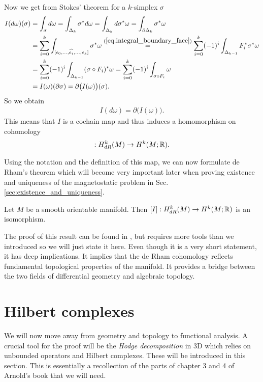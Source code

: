 \documentclass[../master_thesis.tex]{subfiles}
\begin{document}
Now we get from Stokes' theorem for a $k$-simplex $\sigma$
\begin{align*}
    I(d\omega)(\sigma) &= \int_\sigma d\omega 
    = \int_{\Delta_k} \sigma^* d\omega 
    = \int_{\Delta_k} d\sigma^* \omega
    = \int_{\partial \Delta_k} \sigma^* \omega
    \\ &= \sum_{i=0}^k \int_{[e_0,...,\widehat{e_i}, ..., e_k]} \sigma^* \omega
    \stackrel{(\ref{eq:integral_boundary_face})}{=} \sum_{i=0}^{k} (-1)^i \int_{\Delta_{k-1}} F_i^*\sigma^* \omega
    \\ &= \sum_{i=0}^{k} (-1)^i \int_{\Delta_{k-1}} (\sigma\circ F_i)^* \omega
    = \sum_{i=0}^{k} (-1)^i \int_{\sigma\circ F_i} \omega
    \\ &= I(\omega)(\partial \sigma) = \partial \big(I(\omega)\big) (\sigma).
\end{align*}
So we obtain
\begin{align*}
    I(d\omega) = \partial \big(I(\omega)\big).
\end{align*}
This means that $I$ is a cochain map and thus 
induces a homomorphism on cohomology
\begin{align*}
    [I]:H^k_{dR}(M) \rightarrow H^k(M;\real).
\end{align*}

Using the notation and the definition of this map, we can now formulate 
de Rham's theorem which will become very important later when proving
existence and uniqueness of the magnetostatic problem in Sec.\,\ref{sec:existence_and_uniqueness}.
\begin{theorem}\label{thm:de_rhams_theorem}
    Let $M$ be a smooth orientable manifold. Then $[I]: H^k_{dR}(M) \rightarrow H^k(M;\mathbb{R})$ is an isomorphism.
\end{theorem}
The proof of this result can be found in \cite[Sec.\,V.9]{topology_and_geometry}, 
but requires more tools than we introduced so we will just state it here. 
Even though it is a very short 
statement, it has deep implications. It implies that the de Rham cohomology
reflects fundamental topological properties of the manifold. It provides a bridge 
between the two fields of differential geometry and algebraic topology.

\section{Hilbert complexes}\label{sec:hilbert_complexes}
We will now move away from geometry and topology to functional analysis.
A crucial tool for the proof will be the \textit{Hodge decomposition} 
in 3D which relies on unbounded operators and Hilbert complexes. These 
will be introduced in this section. This is essentially a 
recollection of the parts of chapter 3 and 4 of Arnold's book \cite{arnold}
that we will need. 
\end{document}
